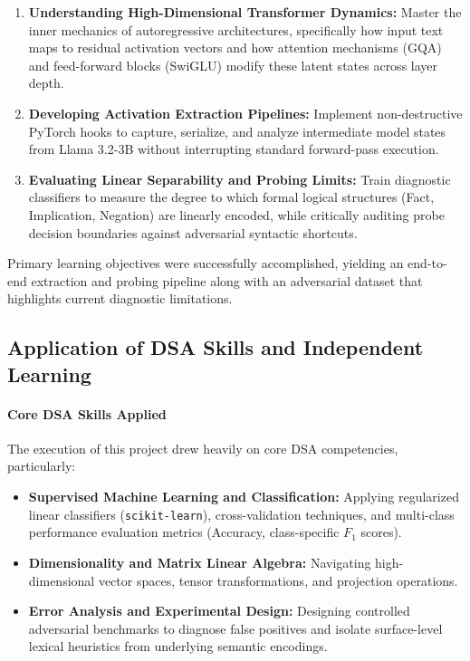\documentclass[12 pt]{article}  %
\begin{document}
\begin{enumerate}
    \item \textbf{Understanding High-Dimensional Transformer Dynamics:} Master 
    the inner mechanics of autoregressive architectures, specifically how input 
    text maps to residual activation vectors and how attention mechanisms (GQA) 
    and feed-forward blocks (SwiGLU) modify these latent states across layer depth.
    \item \textbf{Developing Activation Extraction Pipelines:} Implement 
    non-destructive PyTorch hooks to capture, serialize, and analyze 
    intermediate model states from Llama 3.2-3B without interrupting standard 
    forward-pass execution.
    \item \textbf{Evaluating Linear Separability and Probing Limits:} Train 
    diagnostic classifiers to measure the degree to which formal logical 
    structures (Fact, Implication, Negation) are linearly encoded, while 
    critically auditing probe decision boundaries against adversarial syntactic 
    shortcuts.
\end{enumerate}

Primary learning objectives were successfully accomplished, yielding an 
end-to-end extraction and probing pipeline along with an adversarial dataset 
that highlights current diagnostic limitations.

\subsection{Application of DSA Skills and Independent Learning}

\paragraph{Core DSA Skills Applied}
The execution of this project drew heavily on core DSA competencies, particularly:

\begin{itemize}
    \item \textbf{Supervised Machine Learning and Classification:} Applying 
    regularized linear classifiers (\texttt{scikit-learn}), cross-validation 
    techniques, and multi-class performance evaluation metrics (Accuracy, 
    class-specific $F_1$ scores).
    \item \textbf{Dimensionality and Matrix Linear Algebra:} Navigating 
    high-dimensional vector spaces, tensor transformations, and projection 
    operations.
    \item \textbf{Error Analysis and Experimental Design:} Designing controlled 
    adversarial benchmarks to diagnose false positives and isolate surface-level 
    lexical heuristics from underlying semantic encodings.
\end{itemize}
\end{document}

